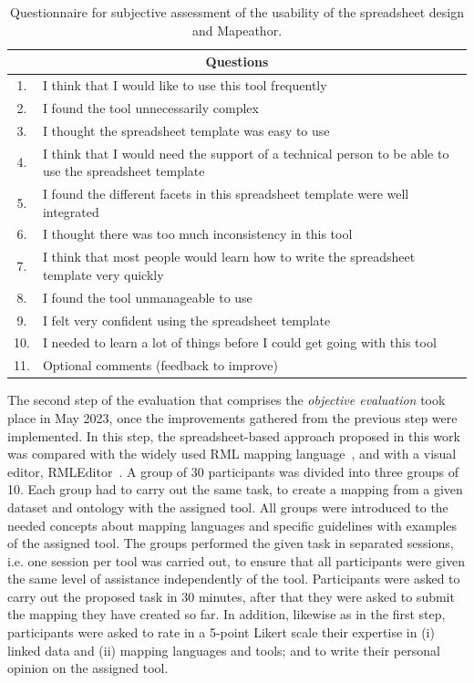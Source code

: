 \begin{table}[t!]
\caption{Questionnaire for subjective assessment of the usability of the spreadsheet design and Mapeathor. }
\centering
\label{tab:chp5_sub_questionnaire}
\resizebox{\columnwidth}{!}
{\begin{tabular}{cl}
\multicolumn{2}{c}{\textbf{Questions}} \\ \midrule
1. & I think that I would like to use this tool frequently\\ \midrule
2. & I found the tool unnecessarily complex\\ \midrule
3. & I thought the spreadsheet template was easy to use\\ \midrule
4. & I think that I would need the support of a technical person to be able to use the spreadsheet template\\ \midrule
5. & I found the different facets in this spreadsheet template were well integrated\\ \midrule
6. & I thought there was too much inconsistency in this tool\\ \midrule
7. & I think that most people would learn how to write the spreadsheet template very quickly\\ \midrule
8. & I found the tool unmanageable to use\\ \midrule
9. & I felt very confident using the spreadsheet template\\ \midrule
10. & I needed to learn a lot of things before I could get going with this tool\\ \midrule
11. & Optional comments (feedback to improve) \\ \bottomrule
\end{tabular}}
\end{table}





The second step of the evaluation that comprises the \textit{objective evaluation} took place in May 2023, once the improvements gathered from the previous step were implemented. In this step, the spreadsheet-based approach proposed in this work was compared with the widely used RML mapping language~\citep{Dimou2014rml}, and with a visual editor, RMLEditor~\citep{heyvaert2016rmleditor}. A group of 30 participants was divided into three groups of 10. Each group had to carry out the same task, to create a mapping from a given dataset and ontology with the assigned tool. All groups were introduced to the needed concepts about mapping languages and specific guidelines with examples of the assigned tool. The groups performed the given task in separated sessions, i.e. one session per tool was carried out, to ensure that all participants were given the same level of assistance independently of the tool. Participants were asked to carry out the proposed task in 30 minutes, after that they were asked to submit the mapping they have created so far. In addition, likewise as in the first step, participants were asked to rate in a 5-point Likert scale their expertise in (i) linked data and (ii) mapping languages and tools; and to write their personal opinion on the assigned tool.


